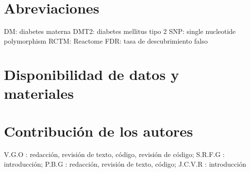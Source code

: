 \documentclass{bmcart}
\begin{document}
\begin{frontmatter}
\begin{abstractbox}
\begin{abstract}
			
			\end{abstract}
			
			
			\begin{keyword}
			\end{keyword}
		
		
		\end{abstractbox}
	
	\end{frontmatter}
	
	
	
	
	
	
	
	
	
	
	
	\begin{backmatter}
	
		\section*{Abreviaciones}%
		DM: diabetes materna
		DMT2: diabetes mellitus tipo 2
		SNP: single nucleotide polymorphism 
		RCTM: Reactome
		FDR: tasa de descubrimiento falso
		
		\section*{Disponibilidad de datos y materiales}%
		
		\section*{Contribución de los autores}
			V.G.O : redacción, revisión de texto, código, revisión de código; S.R.F.G : introducción; P.B.G : redacción, revisión de texto, código; J.C.V.R : introducción
		
		
		
	
	\end{backmatter}
\end{document}
